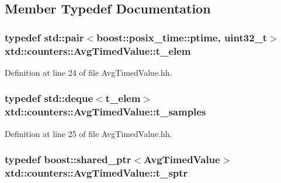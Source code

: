 \subsection{Member Typedef Documentation}
\hypertarget{classxtd_1_1counters_1_1AvgTimedValue_a1495aff37899fa6b011aed1b4283db18}{
\subsubsection[{t\-\_\-elem}]{\setlength{\rightskip}{0pt plus 5cm}typedef std\-::pair$<$boost\-::posix\-\_\-time\-::ptime, uint32\-\_\-t$>$ {\bf xtd\-::counters\-::\-Avg\-Timed\-Value\-::t\-\_\-elem}\hspace{0.3cm}{\ttfamily [protected]}}}\label{classxtd_1_1counters_1_1AvgTimedValue_a1495aff37899fa6b011aed1b4283db18}


Definition at line 24 of file Avg\-Timed\-Value.\-hh.

\hypertarget{classxtd_1_1counters_1_1AvgTimedValue_a71d5e67cb282762c880dc4986e5a8d7c}{
\subsubsection[{t\-\_\-samples}]{\setlength{\rightskip}{0pt plus 5cm}typedef std\-::deque$<${\bf t\-\_\-elem}$>$ {\bf xtd\-::counters\-::\-Avg\-Timed\-Value\-::t\-\_\-samples}\hspace{0.3cm}{\ttfamily [protected]}}}\label{classxtd_1_1counters_1_1AvgTimedValue_a71d5e67cb282762c880dc4986e5a8d7c}


Definition at line 25 of file Avg\-Timed\-Value.\-hh.

\hypertarget{classxtd_1_1counters_1_1AvgTimedValue_a68434add28044efc37c616ec7002d0f8}{
\subsubsection[{t\-\_\-sptr}]{\setlength{\rightskip}{0pt plus 5cm}typedef boost\-::shared\-\_\-ptr$<${\bf Avg\-Timed\-Value}$>$ {\bf xtd\-::counters\-::\-Avg\-Timed\-Value\-::t\-\_\-sptr}}}\label{classxtd_1_1counters_1_1AvgTimedValue_a68434add28044efc37c616ec7002d0f8}


